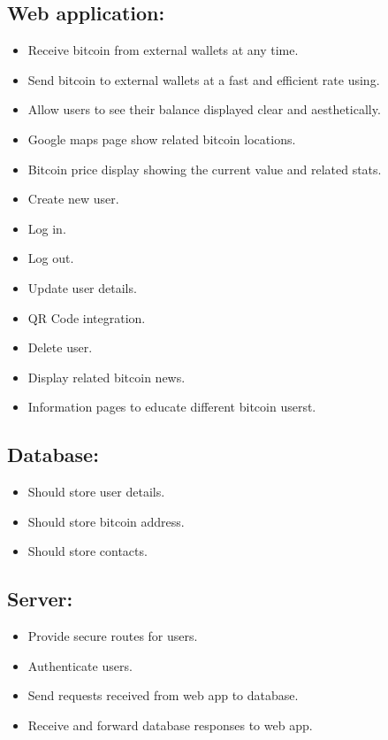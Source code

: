 \subsection{Web application:}
\begin{itemize}
  \item Receive bitcoin from external wallets at any time.
  \item Send bitcoin to external wallets at a fast and efficient rate using.
  \item Allow users to see their balance displayed clear and aesthetically.
  \item Google maps page show related bitcoin locations.
  \item Bitcoin price display showing the current value and related stats.
  \item Create new user.
  \item Log in.
  \item Log out.
  \item Update user details.
  \item QR Code integration.
  \item Delete user.
  \item Display related bitcoin news.
  \item Information pages to educate different bitcoin userst.
\end{itemize}

\subsection{Database:}
\begin{itemize}
  \item Should store user details.
  \item Should store bitcoin address.
  \item Should store contacts.
\end{itemize}

\subsection{Server:}
\begin{itemize}
  \item Provide secure routes for users.
  \item Authenticate users.
  \item Send requests received from web app to database.
  \item Receive and forward database responses to web app.
\end{itemize}


